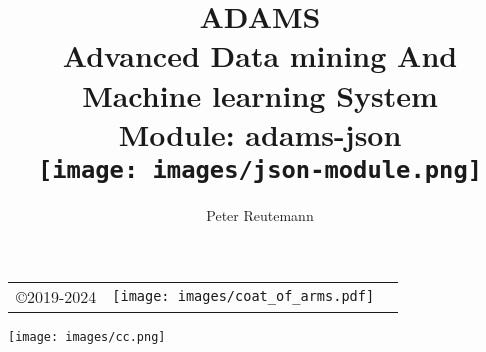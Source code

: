 \documentclass[a4paper]{book}
\title{
  \textbf{ADAMS} \\
  {\Large \textbf{A}dvanced \textbf{D}ata mining \textbf{A}nd \textbf{M}achine
  learning \textbf{S}ystem} \\
  {\Large Module: adams-json} \\
  \vspace{1cm}
  \texttt{[image: images/json-module.png]} \\
}
\author{
  Peter Reutemann
}
\begin{document}
\begin{titlepage}
\maketitle

\thispagestyle{empty}
\center
\begin{table}[b]
	\begin{tabular}{c l l}
		\parbox[c][2cm]{2cm}{\copyright 2019-2024} &
		\parbox[c][2cm]{5cm}{\texttt{[image: images/coat\_of\_arms.pdf]}} \\
	\end{tabular}
	\texttt{[image: images/cc.png]} \\
\end{table}

\end{titlepage}

\tableofcontents

\end{document}
